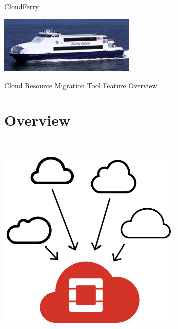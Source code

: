 \documentclass{article}
\begin{document}
\begin{center}
{\Huge{}{\color{color04} CloudFerry}}
\end{center}

\vspace{2pt}
\baselineskip=12pt
\includegraphics[width=250, height=105, keepaspectratio=true]{images/CloudFerry_Brochure-fig001.jpg}

\vspace{24pt}
\hline
{\Huge{}{\color{color04} Cloud Resource Migration Tool}}\linebreak{}
{\Huge{}{\color{color04} Feature Overview}}
\hline

\vspace{36pt}
\section*{{\Huge{}{\color{color04} Overview}}}

\vspace{2pt}
\includegraphics[width=254pt, height=300pt, keepaspectratio=true]{images/CloudFerry_Brochure-fig002.png}
\end{document}

